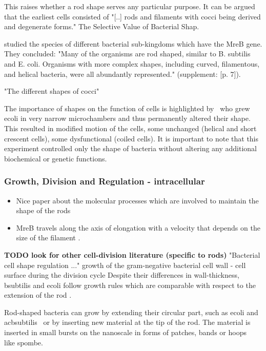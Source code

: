 \documentclass{article}
\newcommand{\todo}[1]{\colorbox{WildStrawberry}{\textcolor{white}{#1}}}
\begin{document}
This raises whether a rod shape serves any particular purpose.
It can be argued that the earliest cells consisted of "[..] rods and filaments with cocci being
derived and degenerate forms." \cite{Young2006} The Selective Value of Bacterial Shap.

\cite{Jones2001} studied the species of different bacterial sub-kingdoms which have the MreB gene.
They concluded: "Many of the organisms are rod shaped, similar to B. subtilis and E. coli.
Organisms with more complex shapes, including curved, filamentous, and helical bacteria, were all abundantly represented." \cite{Jones2001} (supplement: [p. 7]).

\cite{Zapun2008} "The different shapes of cocci"

The importance of shapes on the function of cells is highlighted by~\cite{Takeuchi2005} who grew
\ac{ecoli} in very narrow microchambers and thus permanently altered their shape.
This resulted in modified motion of the cells, some unchanged (helical and short crescent cells),
some dysfunctional (coiled cells).
It is important to note that this experiment controlled only the shape of bacteria without altering
any additional biochemical or genetic functions.

\subsubsection{Growth, Division and Regulation - intracellular}

\begin{itemize}
    \item \cite{DenBlaauwen2008} Nice paper about the molecular processes which are involved to maintain the shape of the rods
    \item MreB travels along the axis of elongation with a velocity that depends on the size of the filament \cite{Olshausen2013}. \todo{do we need this?}
\end{itemize}

\textbf{TODO look for other cell-division literature (specific to rods)} 
\cite{Lleo1990} "Bacterial cell shape regulation ..." \cite{Cooper1991}   growth of the gram-negative bacterial cell wall - cell surface during the division cycle 
Despite their differences in wall-thickness, \ac{bsubtilis} and \ac{ecoli} follow growth rules which are
comparable with respect to the extension of the rod \cite{Chang2014}.

Rod-shaped bacteria can grow by extending their circular part, such as \ac{ecoli} and ac{bsubtilis}~\cite{Errington2020} or by inserting new material at the tip of the rod.
The material is inserted in small bursts on the nanoscale in forms of patches, bands or hoops~\cite{DePedro2003} like \ac{spombe}.
\end{document}

